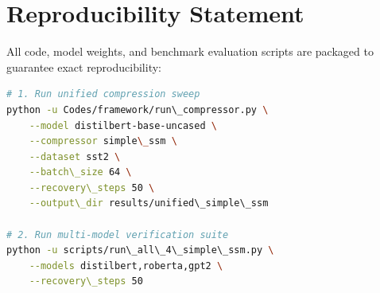 \section{Reproducibility Statement}
All code, model weights, and benchmark evaluation scripts are packaged to guarantee exact reproducibility:
\begin{lstlisting}[language=bash]
# 1. Run unified compression sweep
python -u Codes/framework/run\_compressor.py \
    --model distilbert-base-uncased \
    --compressor simple\_ssm \
    --dataset sst2 \
    --batch\_size 64 \
    --recovery\_steps 50 \
    --output\_dir results/unified\_simple\_ssm

# 2. Run multi-model verification suite
python -u scripts/run\_all\_4\_simple\_ssm.py \
    --models distilbert,roberta,gpt2 \
    --recovery\_steps 50
\end{lstlisting}

